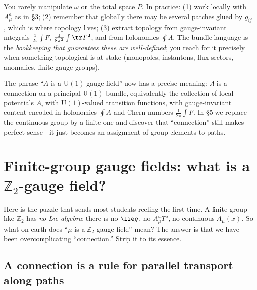 \documentclass[11pt]{article}
\newcommand{\Uone}{\mathrm{U}(1)}
\newcommand{\Ztwo}{\mathbb{Z}_2}
\begin{document}
\begin{nnote}
You rarely manipulate $\omega$ on the total space $P$. In practice: (1) work locally
with $A_\mu^a$ as in \S3; (2) remember that globally there may be several patches glued
by $g_{ij}$, which is where topology lives; (3) extract topology from gauge-invariant
integrals $\frac{1}{2\pi}\int F$, $\frac{1}{8\pi^2}\int\tr F^2$, and from holonomies
$\oint A$. The bundle language is the \emph{bookkeeping that guarantees these are
well-defined}; you reach for it precisely when something topological is at stake
(monopoles, instantons, flux sectors, anomalies, finite gauge groups).
\end{nnote}

\begin{ppreview}
The phrase ``$A$ is a $\Uone$ gauge field'' now has a precise meaning: $A$ is a
connection on a principal $\Uone$-bundle, equivalently the collection of local
potentials $A_i$ with $\Uone$-valued transition functions, with gauge-invariant content
encoded in holonomies $\oint A$ and Chern numbers $\frac1{2\pi}\int F$. In \S5 we
replace the continuous group by a finite one and discover that ``connection'' still
makes perfect sense---it just becomes an assignment of group elements to paths.
\end{ppreview}

\section{Finite-group gauge fields: what is a \texorpdfstring{$\Ztwo$}{Z2}-gauge field?}
\label{sec:finite}

Here is the puzzle that sends most students reeling the first time. A finite group like
$\Ztwo$ has \emph{no Lie algebra}: there is no $\lie g$, no $A_\mu^a T^a$, no continuous
$A_\mu(x)$. So what on earth does ``$\mu$ is a $\Ztwo$-gauge field'' mean? The answer is
that we have been overcomplicating ``connection.'' Strip it to its essence.

\subsection{A connection is a rule for parallel transport along paths}
\end{document}
